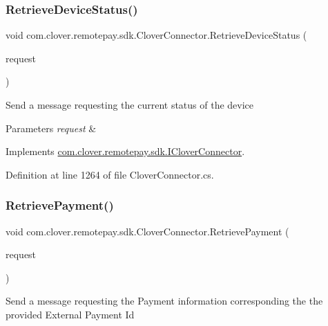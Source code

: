 \subsubsection{\texorpdfstring{Retrieve\+Device\+Status()}{RetrieveDeviceStatus()}}
{\footnotesize\ttfamily void com.\+clover.\+remotepay.\+sdk.\+Clover\+Connector.\+Retrieve\+Device\+Status (\begin{DoxyParamCaption}\item[{Retrieve\+Device\+Status\+Request}]{request }\end{DoxyParamCaption})}



Send a message requesting the current status of the device 


\begin{DoxyParams}{Parameters}
{\em request} & \\
\hline
\end{DoxyParams}


Implements \hyperlink{interfacecom_1_1clover_1_1remotepay_1_1sdk_1_1_i_clover_connector_a172b1a191a58f1f0e4dcc0a8dc7eae48}{com.\+clover.\+remotepay.\+sdk.\+I\+Clover\+Connector}.



Definition at line 1264 of file Clover\+Connector.\+cs.

\mbox{\label{classcom_1_1clover_1_1remotepay_1_1sdk_1_1_clover_connector_a786435c5849a2d8befd83173f70e05a7}} 
\subsubsection{\texorpdfstring{Retrieve\+Payment()}{RetrievePayment()}}
{\footnotesize\ttfamily void com.\+clover.\+remotepay.\+sdk.\+Clover\+Connector.\+Retrieve\+Payment (\begin{DoxyParamCaption}\item[{Retrieve\+Payment\+Request}]{request }\end{DoxyParamCaption})}



Send a message requesting the Payment information corresponding the the provided External Payment Id 


